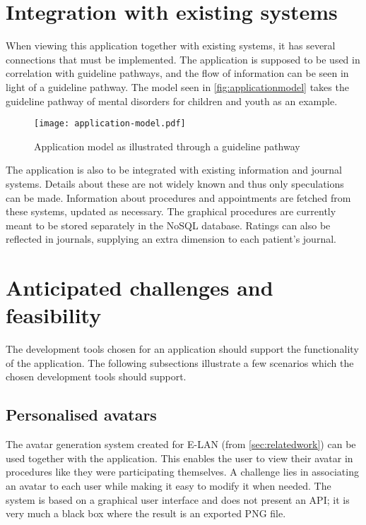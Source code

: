 \section{Integration with existing systems}

When viewing this application together with existing systems, it has several connections that must be implemented. The application is supposed to be used in correlation with guideline pathways, and the flow of information can be seen in light of a guideline pathway. The model seen in \autoref{fig:applicationmodel} takes the guideline pathway of mental disorders for children and youth \autocite{haugland2018} as an example.

\begin{figure}
    \centering
    \texttt{[image: application-model.pdf]}
    \caption{Application model as illustrated through a guideline pathway}
    \label{fig:applicationmodel}
\end{figure}

The application is also to be integrated with existing information and journal systems. Details about these are not widely known and thus only speculations can be made. Information about procedures and appointments are fetched from these systems, updated as necessary. The graphical procedures are currently meant to be stored separately in the NoSQL database. Ratings can also be reflected in journals, supplying an extra dimension to each patient's journal.

\section{Anticipated challenges and feasibility}
\label{sec:anticipatedchallenges}

The development tools chosen for an application should support the functionality of the application. The following subsections illustrate a few scenarios which the chosen development tools should support.

\subsection{Personalised avatars}

The avatar generation system created for E-LAN (from \autoref{sec:relatedwork}) can be used together with the application. This enables the user to view their avatar in procedures like they were participating themselves. A challenge lies in associating an avatar to each user while making it easy to modify it when needed. The system is based on a graphical user interface and does not present an API; it is very much a black box where the result is an exported PNG file.

